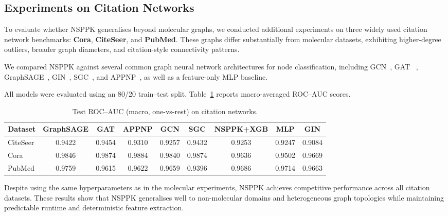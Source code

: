 \subsection{Experiments on Citation Networks}
\label{sec:citation}

To evaluate whether NSPPK generalises beyond molecular graphs,
we conducted additional experiments on three widely used citation
network benchmarks: \textbf{Cora}, \textbf{CiteSeer}, and \textbf{PubMed}.
These graphs differ substantially from molecular datasets, exhibiting
higher-degree outliers, broader graph diameters, and citation-style
connectivity patterns.

We compared NSPPK against several common graph neural network
architectures for node classification, including
GCN~\citep{kipf2017semi}, GAT
~\citep{velivckovic2018gat},
GraphSAGE~\citep{hamilton2017graphsage}, GIN~\citep{xu2019powerful},
SGC~\citep{wu2019simplifying}, and APPNP~\citep{klicpera2019predict},
as well as a feature-only MLP baseline.

All models were evaluated using an 80/20 train--test split.
Table~\ref{tab:citation_results} reports macro-averaged ROC--AUC scores.

\begin{table}[t]
\centering
\caption{Test ROC--AUC (macro, one-vs-rest) on citation networks.}
\label{tab:citation_results}
\setlength{\tabcolsep}{4pt}

\begin{adjustbox}{max width=\textwidth}
\begin{tabular}{lcccccccc}
\toprule
Dataset
& GraphSAGE
& GAT
& APPNP
& GCN
& SGC
& NSPPK+XGB
& MLP
& GIN \\
\midrule
CiteSeer
& 0.9422 & 0.9454 & 0.9310 & 0.9257 & 0.9432 & 0.9253 & 0.9247 & 0.9084 \\
Cora
& 0.9846 & 0.9874 & 0.9884 & 0.9840 & 0.9874 & 0.9636 & 0.9502 & 0.9669 \\
PubMed
& 0.9759 & 0.9615 & 0.9622 & 0.9659 & 0.9396 & 0.9686 & 0.9714 & 0.9663 \\
\bottomrule
\end{tabular}
\end{adjustbox}
\end{table}

Despite using the same hyperparameters as in the molecular experiments,
NSPPK achieves competitive performance across all citation datasets.
These results show that NSPPK generalises well to non-molecular
domains and heterogeneous graph topologies while maintaining predictable
runtime and deterministic feature extraction.

